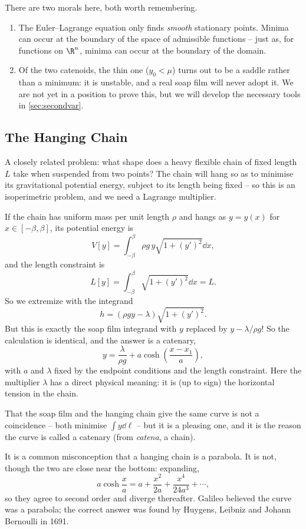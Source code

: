 There are two morals here, both worth remembering.
\begin{enumerate}[label=(\roman*)]
	\item The Euler--Lagrange equation only finds \emph{smooth} stationary points. Minima can occur at the boundary of the space of admissible functions -- just as, for functions on $\R^n$, minima can occur at the boundary of the domain.
	\item Of the two catenoids, the thin one ($y_0 < \mu$) turns out to be a saddle rather than a minimum: it is unstable, and a real soap film will never adopt it. We are not yet in a position to prove this, but we will develop the necessary tools in \autoref{sec:secondvar}.
\end{enumerate}

\subsection{The Hanging Chain}

A closely related problem: what shape does a heavy flexible chain of fixed length $L$ take when suspended from two points? The chain will hang so as to minimise its gravitational potential energy, subject to its length being fixed -- so this is an isoperimetric problem, and we need a Lagrange multiplier.

If the chain has uniform mass per unit length $\rho$ and hangs as $y = y(x)$ for $x \in [-\beta, \beta]$, its potential energy is
$$
V[y] = \int_{-\beta}^{\beta}\rho g\, y \sqrt{1 + (y')^2}\dd x,
$$
and the length constraint is
$$
L[y] = \int_{-\beta}^{\beta}\sqrt{1 + (y')^2}\dd x = L.
$$
So we extremize with the integrand
$$
h = (\rho g y - \lambda)\sqrt{1 + (y')^2}.
$$
But this is exactly the soap film integrand with $y$ replaced by $y - \lambda/\rho g$! So the calculation is identical, and the answer is a catenary,
$$
y = \frac{\lambda}{\rho g} + a \cosh\left(\frac{x - x_1}{a}\right),
$$
with $a$ and $\lambda$ fixed by the endpoint conditions and the length constraint. Here the multiplier $\lambda$ has a direct physical meaning: it is (up to sign) the horizontal tension in the chain.

That the soap film and the hanging chain give the same curve is not a coincidence -- both minimise $\int y \dd\ell$ -- but it is a pleasing one, and it is the reason the curve is called a catenary (from \emph{catena}, a chain).

It is a common misconception that a hanging chain is a parabola. It is not, though the two are close near the bottom: expanding,
$$
a\cosh\frac{x}{a} = a + \frac{x^2}{2a} + \frac{x^4}{24a^3} + \cdots,
$$
so they agree to second order and diverge thereafter. Galileo believed the curve was a parabola; the correct answer was found by Huygens, Leibniz and Johann Bernoulli in 1691.

